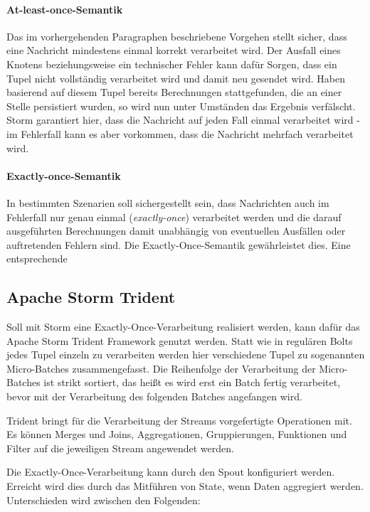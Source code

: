 \documentclass[a4paper,11pt]{scrartcl}
\begin{document}
  \paragraph{At-least-once-Semantik}
  Das im vorhergehenden Paragraphen beschriebene Vorgehen stellt
  sicher, dass eine Nachricht mindestens einmal korrekt verarbeitet
  wird. Der Ausfall eines Knotens beziehungsweise ein technischer
  Fehler kann dafür Sorgen, dass ein Tupel nicht vollständig
  verarbeitet wird und damit neu gesendet wird. Haben basierend auf
  diesem Tupel bereits Berechnungen stattgefunden, die an einer Stelle
  persistiert wurden, so wird nun unter Umständen das Ergebnis
  verfälscht. Storm garantiert hier, dass die Nachricht auf jeden Fall
  einmal verarbeitet wird - im Fehlerfall kann es aber vorkommen, dass
  die Nachricht mehrfach verarbeitet wird.

  \paragraph{Exactly-once-Semantik}
  In bestimmten Szenarien soll sichergestellt sein, dass Nachrichten
  auch im Fehlerfall nur genau einmal (\textit{exactly-once})
  verarbeitet werden und die darauf ausgeführten Berechnungen damit
  unabhängig von eventuellen Ausfällen oder auftretenden Fehlern sind.
  Die Exactly-Once-Semantik gewährleistet dies. Eine entsprechende 

  \subsection{Apache Storm Trident} 
  Soll mit Storm eine Exactly-Once-Verarbeitung realisiert werden,
  kann dafür das Apache Storm Trident Framework genutzt werden. Statt
  wie in regulären Bolts jedes Tupel einzeln zu verarbeiten werden
  hier verschiedene Tupel zu sogenannten Micro-Batches
  zusammengefasst. Die Reihenfolge der Verarbeitung der Micro-Batches
  ist strikt sortiert, das heißt es wird erst ein Batch fertig
  verarbeitet, bevor mit der Verarbeitung des folgenden Batches
  angefangen wird.\cite{stormtrident}

  Trident bringt für die Verarbeitung der Streams vorgefertigte
  Operationen mit. Es können Merges und Joins, Aggregationen,
  Gruppierungen, Funktionen und Filter auf die jeweiligen Stream
  angewendet werden.

  Die Exactly-Once-Verarbeitung kann durch den Spout konfiguriert
  werden. Erreicht wird dies durch das Mitführen von State, wenn Daten
  aggregiert werden. Unterschieden wird zwischen den
  Folgenden:\cite{stormtridentstate}
\end{document}
